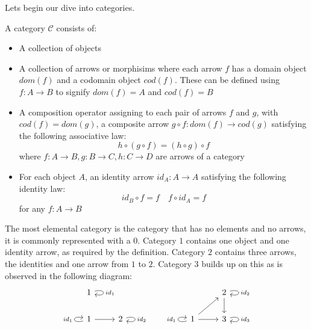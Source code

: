 
Lets begin our dive into categories.

\begin{definition} A category $\mathcal{C}$ consists of:
  \begin{itemize}
  \item A collection of objects
  \item A collection of arrows or morphisims where each arrow $f$ has a domain object $dom(f)$ and a codomain object $cod (f)$. These can be defined using $f : A \to B $ to signify $dom(f) = A$ and $cod(f) = B$
  \item A composition operator assigning to each pair of arrows $f$ and $g$, with $cod(f) = dom(g)$, a composite arrow $g \circ f : dom(f) \to cod (g)$ satisfying the following associative law:
    \[
      h \circ (g \circ f) = (h \circ g) \circ f
    \]
    where $f : A \to B, g : B \to C, h : C \to D$ are arrows of a category
  \item For each object $A$, an identity arrow $id_A : A \to A$ satisfying the following identity law:
    \[
      id_B \circ f = f \quad f \circ id_A = f 
    \]
    for any $f : A \to B$
  \end{itemize}
\end{definition}
\begin{remark}
\end{remark}
\begin{example} The most elemental category is the category that has no elements and no arrows, it is commonly represented with a $0$. Category $1$ contains one object and one identity arrow, as required by the definition. Category $2$ contains three arrows, the identities and one arrow from $1$ to $2$. Category $3$ builds up on this as is observed in the following diagram:
  \[
    \begin{tikzcd}
      1 \arrow[loop right, "id_1"] & & & & & 2 \arrow[d] \arrow[loop right, "id_2"] \\
      1 \arrow[r] \arrow[loop left, "id_1"] & 2 \arrow[loop right, "id_2"] & & &1 \arrow[r] \arrow[ru] \arrow[loop left, "id_1"] & 3 \arrow[loop right, "id_3"]
    \end{tikzcd}
  \]
\end{example}
